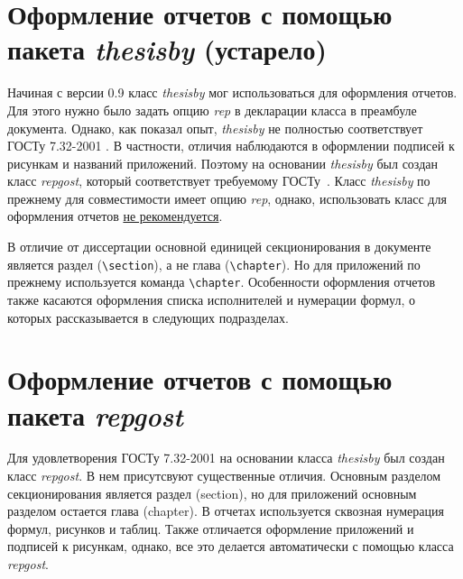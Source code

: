 \section{Оформление отчетов с помощью пакета {\itshape thesisby} (устарело)}\label{sec:rep}

Начиная с версии 0.9 класс {\itshape thesisby} мог использоваться для оформления отчетов. Для этого нужно было задать опцию {\itshape rep} в декларации класса в преамбуле документа. Однако, как показал опыт, {\itshape thesisby} не полностью соответствует ГОСТу 7.32-2001 \cite{gost7-32}. В частности, отличия наблюдаются в оформлении подписей к рисункам и названий приложений. Поэтому на основании {\itshape thesisby} был создан класс {\itshape repgost}, который соответствует требуемому ГОСТу~\cite{repgost}. Класс {\itshape thesisby} по прежнему для совместимости имеет опцию {\itshape rep}, однако, использовать класс для оформления отчетов \underline{не рекомендуется}.

В отличие от диссертации основной единицей секционирования в документе является раздел (\verb|\section|), а не глава (\verb|\chapter|). Но для приложений по прежнему используется команда \verb|\chapter|. Особенности оформления отчетов также касаются оформления списка исполнителей и нумерации формул, о которых рассказывается в следующих подразделах.

\section{Оформление отчетов с помощью пакета {\itshape repgost}}\label{sec:repgost}

Для удовлетворения ГОСТу 7.32-2001 на основании класса {\itshape thesisby} был создан класс {\itshape repgost}. В нем присутсвуют существенные отличия. Основным разделом секционирования является раздел (section), но для приложений основным разделом остается глава (chapter). В отчетах используется сквозная нумерация формул, рисунков и таблиц. Также отличается оформление приложений и подписей к рисункам, однако, все это делается автоматически с помощью класса {\itshape repgost}. 

